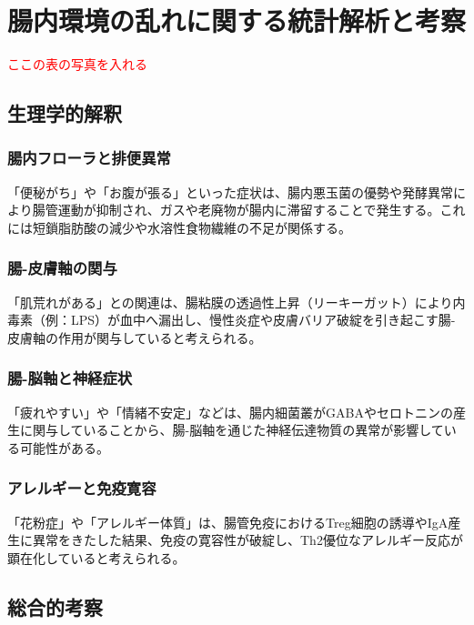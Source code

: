 \documentclass[a4paper,12pt]{article}
\begin{document}
\section{腸内環境の乱れに関する統計解析と考察}

\textcolor{red}{ここの表の写真を入れる}

\subsection*{生理学的解釈}

\subsubsection*{腸内フローラと排便異常}

「便秘がち」や「お腹が張る」といった症状は、腸内悪玉菌の優勢や発酵異常により腸管運動が抑制され、ガスや老廃物が腸内に滞留することで発生する。これには短鎖脂肪酸の減少や水溶性食物繊維の不足が関係する。

\subsubsection*{腸-皮膚軸の関与}

「肌荒れがある」との関連は、腸粘膜の透過性上昇（リーキーガット）により内毒素（例：LPS）が血中へ漏出し、慢性炎症や皮膚バリア破綻を引き起こす腸-皮膚軸の作用が関与していると考えられる。

\subsubsection*{腸-脳軸と神経症状}

「疲れやすい」や「情緒不安定」などは、腸内細菌叢がGABAやセロトニンの産生に関与していることから、腸-脳軸を通じた神経伝達物質の異常が影響している可能性がある。

\subsubsection*{アレルギーと免疫寛容}

「花粉症」や「アレルギー体質」は、腸管免疫におけるTreg細胞の誘導やIgA産生に異常をきたした結果、免疫の寛容性が破綻し、Th2優位なアレルギー反応が顕在化していると考えられる。

\subsection*{総合的考察}
\end{document}
